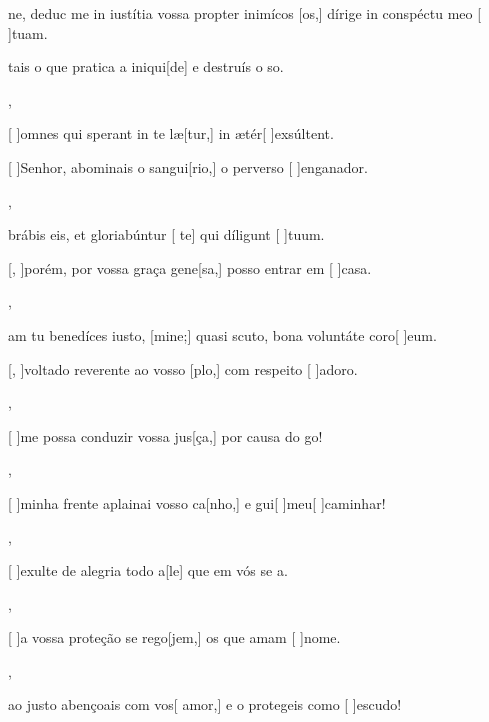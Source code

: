 {  {\item {}ne, deduc me in iustítia vossa propter inimícos [os,] dírige in conspéctu meo [ ]tuam.}%
    {\item {}tais o que pratica a iniqui[de] e destruís o so.},
  {\item {}[ ]{om}nes qui sperant in te læ[tur,] in ætér[ ]{ex}{súl}\-tent.}%
    {\item {}[ ]{Se}nhor, abominais o sangui[rio,] o perverso [ ]{en}{ga}nador.},
  {\item {}brábis eis, et gloriabúntur [ te] qui díligunt [ ]{tu}um.}%
    {\item {}[, ]{po}rém, por vossa graça gene[sa,] posso entrar em [ ]{ca}sa.},
  {\item {}am tu benedíces iusto, [mine;] quasi scuto, bona voluntáte coro[ ]{e}um.}%
    {\item {}[, ]{vol}tado reverente ao vosso [plo,] com respeito [ ]{a}{do}ro.},
  {}%
    {\item {}[ ]{me} possa conduzir vossa jus[ça,] por causa do go!},
  {}%
    {\item {}[ ]{mi}nha frente aplainai vosso ca[nho,] e gui[ ]{meu}[ ]{ca}minhar!},
  {}%
    {\item {}[ ]{e}xulte de alegria todo a[le] que em vós se a.},
  {}%
    {\item {}[ ]{a} vossa proteção se rego[jem,] os que amam [ ]{no}me.},
  {}%
    {\item {} ao justo abençoais com vos[ amor,] e o protegeis como [ ]{es}{cu}do!}
}